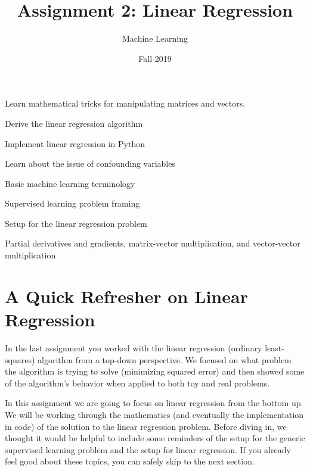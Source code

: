 \documentclass[assignment02_Solutions]{subfiles}
\title{Assignment 2: Linear Regression}
\author{Machine Learning}
\date{Fall 2019}
\begin{document}
\maketitle
\thispagestyle{firstpage}



\begin{learningobjectives}
\bi
\item Learn mathematical tricks for manipulating matrices and vectors.
\item Derive the linear regression algorithm
\item Implement linear regression in Python
\item Learn about the issue of confounding variables
\ei
\end{learningobjectives}

\begin{priorknowledge}
\bi
\item Basic machine learning terminology
\item Supervised learning problem framing
\item Setup for the linear regression problem
\item Partial derivatives and gradients, matrix-vector multiplication, and vector-vector multiplication
\ei
\end{priorknowledge}




\section{A Quick Refresher on Linear Regression}

In the last assignment you worked with the linear regression (ordinary least-squares) algorithm from a top-down perspective.  We focused on what problem the algorithm is trying to solve (minimizing squared error) and then showed some of the algorithm's behavior when applied to both toy and real problems.

In this assignment we are going to focus on linear regression from the bottom up.  We will be working through the mathematics (and eventually the implementation in code) of the solution to the linear regression problem.  Before diving in, we thought it would be helpful to include some reminders of the setup for the generic supervised learning problem and the setup for linear regression.  If you already feel good about these topics, you can safely skip to the next section.

\vspace{1em}
\end{document}
